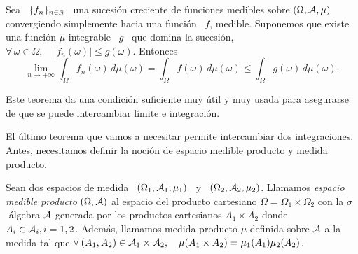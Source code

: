 \begin{teorema}
\label{Teo:MP:ConvergenciaDominada}
%
  Sea  \ $\{  f_n \}_{n  \in  \mathbb{N}}$ \  una sucesi\'on  creciente de  funciones
  medibles sobre $(\Omega,\mathcal{A},\mu)$  convergiendo simplemente hacia una funci\'on
  \ $f$, medible.  Suponemos que existe una funci\'on  $\mu$-integrable  \ $g$ \
  que  domina  la  sucesi\'on,  \ie  $\forall  \, \omega  \in  \Omega,  \quad  |
  f_n(\omega) | \le g(\omega)$. Entonces
  \[
  \lim_{n  \to  +\infty}  \int_\Omega  f_n(\omega) \,  d\mu(\omega)  =  \int_\Omega
  f(\omega) \, d\mu(\omega) \le \int_\Omega  g(\omega)  \, d\mu(\omega).
  \]
\end{teorema}
%
Este  teorema  da  una  condici\'on  suficiente  muy \'util  y  muy  usada  para
asegurarse de que se puede intercambiar l\'imite e integraci\'on.

El   \'ultimo  teorema   que  vamos   a  necesitar   permite   intercambiar  dos
integraciones.   Antes,  necesitamos  definir  la noci\'on  de  espacio  medible
producto y medida producto.
%
\begin{definicion}
\label{Def:MP:EspacioMedidaProductos}
%
  Sean dos  espacios de  medida \  $(\Omega_1, \mathcal{A}_1, \mu_1)$  \ y  \ $(\Omega_2,
  \mathcal{A}_2,  \mu_2)$. Llamamos  {\it espacio  medible producto}  $(\Omega ,  \mathcal{A})$ al
  espacio del  producto cartesiano  $\Omega = \Omega_1  \times \Omega_2$  con la
  $\sigma$-\'algebra  $\mathcal{A}$ generada  por los  productos cartesianos  $A_1 \times
  A_2$ donde $A_i \in \mathcal{A}_i, i  = 1, 2$. Adem\'as, llamamos medida producto $\mu$
  definida sobre $\mathcal{A}$ a la medida  tal que $\forall \: (A_1,A_2) \in \mathcal{A}_1 \times
  \mathcal{A}_2, \quad \mu(A_1 \times A_2) = \mu_1(A_1) \mu_2(A_2)$.
\end{definicion}


